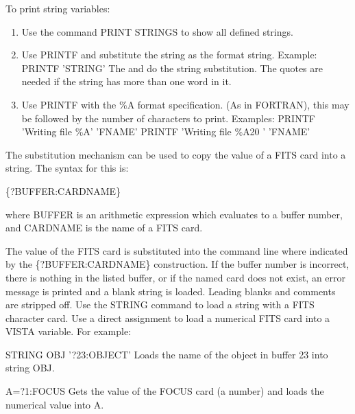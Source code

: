 To print string variables:
\begin{enumerate}
  \item{Use the command PRINT STRINGS to show all defined strings.}
  \item{Use PRINTF and substitute the string as the format string.
       Example:\newline
       PRINTF '{STRING}'\newline
       The { and } do the string substitution.  The quotes are needed
       if the string has more than one word in it.}

  \item{Use PRINTF with the \%A format specification.  (As in FORTRAN),
       this may be followed by the number of characters to print.
       Examples:\newline
	PRINTF 'Writing file \%A' '{FNAME}'\newline
	PRINTF 'Writing file \%A20 ' '{FNAME}'}
\end{enumerate}

The substitution mechanism can be used to copy the value of a FITS card
into a string.  The syntax for this is:

\begin{hanging}
  \item{\{?BUFFER:CARDNAME\}}
\end{hanging}

where BUFFER is an arithmetic expression which evaluates to a buffer
number, and CARDNAME is the name of a FITS card.

The value of the FITS card is substituted into the command line where
indicated by the \{?BUFFER:CARDNAME\} construction.  If the buffer number
is incorrect, there is nothing in the listed buffer, or if the named card
does not exist, an error message is printed and a blank string is
loaded. Leading blanks and comments are stripped off. Use the STRING
command to load a string with a FITS character card. Use a direct
assignment to load a numerical FITS card into a VISTA variable.  For
example:
\begin{example}
  \item[STRING OBJ '{?23:OBJECT}'\hfill]{Loads the name of the object
       in buffer 23 into string {OBJ}.}
  \item[A={?1:FOCUS}\hfill]{Gets the value of the FOCUS
       card (a number) and loads the numerical value into A.}
\end{example}


